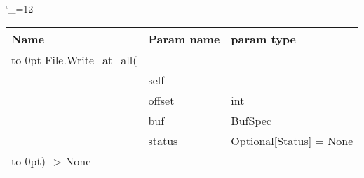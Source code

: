 \begingroup \catcode`\_=12 \tt
\begin{tabular}{lll}
\toprule
\textrm{Name}&\textrm{Param name}&\textrm{param type}\\
\midrule
\hbox to 0pt {File.Write_at_all(\hss}\\
& self\\
& offset & int\\
& buf & BufSpec\\
& status & Optional[Status] = None\\
\hbox to 0pt{) -> None\hss}\\
\bottomrule
\end{tabular}
\endgroup
